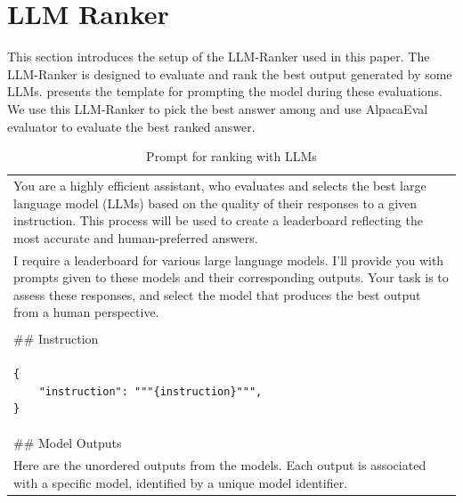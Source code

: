 \documentclass{article}
\begin{document}
\section{LLM Ranker}

This section introduces the setup of the LLM-Ranker used in this paper. 
The LLM-Ranker is designed to evaluate and rank the best output generated by some LLMs.
 presents the template for prompting the model during these evaluations. 
We use this LLM-Ranker to pick the best answer among and use AlpacaEval evaluator 
to evaluate the best ranked answer.


\begin{table}[t]
    \centering
    \small
    \caption{Prompt for ranking with LLMs}
    \begin{tabular}{@{}p{1\linewidth}@{}}
    \toprule
    
You are a highly efficient assistant, who evaluates and selects the best large language model (LLMs) based on the quality of their responses to a given instruction. This process will be used to create a leaderboard reflecting the most accurate and human-preferred answers.
\\
I require a leaderboard for various large language models. I'll provide you with prompts given to these models and their corresponding outputs. Your task is to assess these responses, and select the model that produces the best output from a human perspective.
\\
\\
\#\# Instruction
\\
\begin{verbatim}
{
    "instruction": """{instruction}""",
}
\end{verbatim}
\\
\#\# Model Outputs
\\
Here are the unordered outputs from the models. Each output is associated with a specific model, identified by a unique model identifier.


\end{tabular}
\end{table}
\end{document}
